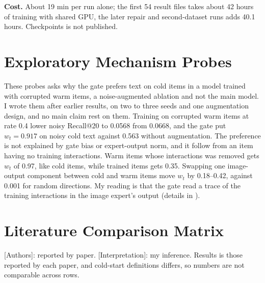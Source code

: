 \documentclass[conference]{IEEEtran}
\newcommand{\code}[1]{\texttt{\detokenize{#1}}}
\begin{document}
\textbf{Cost.} About 19 min per run alone; the first 54 result files takes about 42 hours of training with shared GPU, the later repair and second-dataset runs adds 40.1 hours. Checkpoints is not published.


\section{Exploratory Mechanism Probes}
\label{app:probes}

These probes asks why the gate prefers text on cold items in a model trained with corrupted warm items, a noise-augmented ablation and not the main model. I wrote them after earlier results, on two to three seeds and one augmentation design, and no main claim rest on them. Training on corrupted warm items at rate 0.4 lower noisy Recall@20 to 0.0568 from 0.0668, and the gate put $w_t=0.917$ on noisy cold text against 0.563 without augmentation. The preference is not explained by gate bias or expert-output norm, and it follow from an item having no training interactions. Warm items whose interactions was removed gets $w_t$ of 0.97, like cold items, while trained items gets 0.35. Swapping one image-output component between cold and warm items move $w_t$ by 0.18--0.42, against 0.001 for random directions. My reading is that the gate read a trace of the training interactions in the image expert's output (details in \code{docs/hypotheses.md}).

\clearpage
\onecolumn
\section{Literature Comparison Matrix}
\label{app:matrix}

[Authors]: reported by paper. [Interpretation]: my inference. Results is those reported by each paper, and cold-start definitions differs, so numbers are not comparable across rows.
\end{document}
